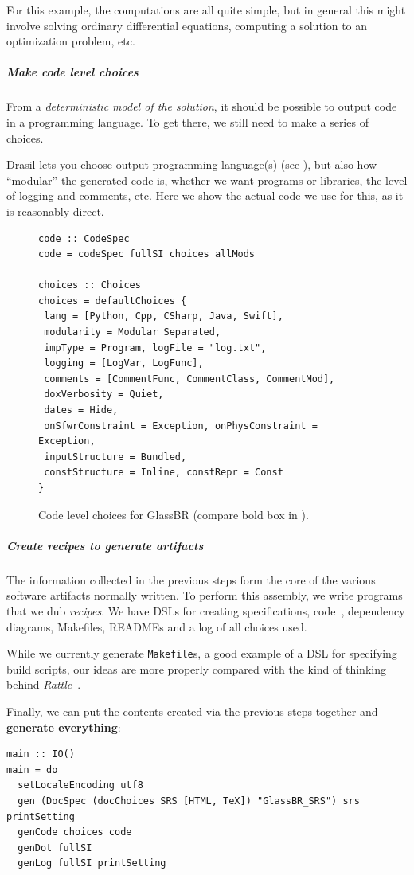 \documentclass[a4paper,UKenglish,cleveref,autoref,thm-restate]{oasics-v2021}
\begin{document}
For this example, the computations are all quite simple, but in general this
might involve solving ordinary differential equations, computing a solution to
an optimization problem, etc.

\subparagraph*{Make code level choices}
From a \emph{deterministic model of the solution}, it should be
possible to output code in a programming language. To get there, we still need
to make a series of choices.

Drasil lets you choose output programming language(s) (see
), but also how ``modular'' the generated code is, whether
we want programs or libraries, the level of logging and comments, etc. Here we
show the actual code we use for this, as it is reasonably direct.

\begin{figure}[htb]
\begin{lstlisting}
code :: CodeSpec
code = codeSpec fullSI choices allMods

choices :: Choices
choices = defaultChoices {
 lang = [Python, Cpp, CSharp, Java, Swift], 
 modularity = Modular Separated,
 impType = Program, logFile = "log.txt", 
 logging = [LogVar, LogFunc],
 comments = [CommentFunc, CommentClass, CommentMod], 
 doxVerbosity = Quiet,
 dates = Hide, 
 onSfwrConstraint = Exception, onPhysConstraint = Exception,
 inputStructure = Bundled, 
 constStructure = Inline, constRepr = Const
}
\end{lstlisting}
  \caption{Code level choices for GlassBR (compare bold box in ).}
  \label{fig:CodeChoices}
\end{figure}

\subparagraph*{Create recipes to generate artifacts}
The information collected in the previous steps form the core of the various
software artifacts normally written. To perform this assembly, we write
programs that we dub \emph{recipes}. We have DSLs for creating specifications,
code~\cite{GOOLPEPM}, dependency diagrams, Makefiles, READMEs and a log of all choices
used.

While we currently generate \texttt{Makefile}s, a good example of a DSL for
specifying build scripts, our ideas are more properly compared with
the kind of thinking behind \textit{Rattle}~\cite{mitchell:rattle_18_nov_2020}.

Finally, we can put the contents created via the previous steps together and
\textbf{generate everything}:
\begin{lstlisting}
main :: IO()
main = do
  setLocaleEncoding utf8
  gen (DocSpec (docChoices SRS [HTML, TeX]) "GlassBR_SRS") srs printSetting
  genCode choices code
  genDot fullSI
  genLog fullSI printSetting
\end{lstlisting}
\end{document}
